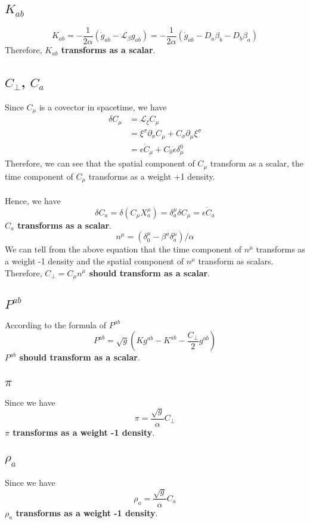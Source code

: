 \documentclass{article}
\begin{document}
\subsection{$K_{ab}$}
\[
K_{ab} = -\frac{1}{2\alpha}({\dot g}_{ab} - \mathcal{L}_{\beta}g_{ab}) =  -\frac{1}{2\alpha}({\dot g}_{ab} - D_{a}\beta_{b} - D_{b}\beta_{a})
\]
Therefore, {\bf{\color{red}$K_{ab}$ transforms as a scalar}}. 
\subsection{$C_{\perp}$, $C_{a}$}
Since $C_{\mu}$ is a covector in spacetime, we have
\begin{align*}
\delta C_{\mu} & = \mathcal{L}_{\xi} C_{\mu}\\
& = \xi^{\sigma}\partial_{\sigma}C_{\mu} + C_{\sigma}\partial_{\mu}\xi^{\sigma}\\
& = \epsilon {\dot C}_{\mu} + C_{0}{\dot \epsilon}\delta^{0}_{\mu} 
\end{align*}
Therefore, we can see that the spatial component of $C_{\mu}$ transform as a scalar, the time component of $C_{\mu}$ transforms as a weight +1 density. \\
\\
Hence, we have
\[
\boxed{
\delta C_{a} = \delta (C_{\mu}X_{a}^{\mu}) = \delta_{a}^{\mu} \delta C_{\mu} = \epsilon {\dot C}_{a}
}
\]
{\bf {\color {red}$C_{a}$ transforms as a scalar}}.
\[
n^{\mu} = (\delta^{\mu}_{0} - \beta^{a}\delta_{a}^{\mu})/\alpha
\]
We can tell from the above equation that the time component of $n^{\mu}$ transforms as a weight -1 density and the spatial component of $n^{\mu}$ transform as scalars. Therefore, {\bf {\color{red}$C_{\perp} = C_{\mu}n^{\mu}$ should transform as a scalar}}.
\subsection{$P^{ab}$}
According to the formula of $P^{ab}$
\[
P^{ab} = \sqrt{g}(Kg^{ab} - K^{ab} -\frac{C_{\perp}}{2}g^{ab})
\]
{\bf {\color{red} $P^{ab}$ should transform as a scalar}}.
\subsection{$\pi$}
Since we have
\[
\pi = \frac{\sqrt{g}}{\alpha}C_{\perp}
\]
{\bf{\color{red}$\pi$ transforms as a weight -1 density}}.
\subsection{$\rho_{a}$}
Since we have
\[
\rho_{a} = \frac{\sqrt{g}}{\alpha}C_{a}
\]
{\bf{\color{red}$\rho_{a}$ transforms as a weight -1 density}}.
\end{document}
